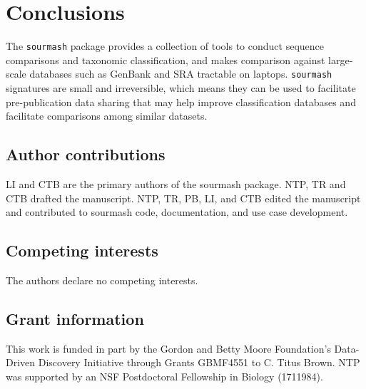 \documentclass[10pt,a4paper,twocolumn]{article}
\begin{document}
\section*{Conclusions}

The \lstinline{sourmash} package provides a collection of tools to conduct sequence comparisons and taxonomic classification, and makes comparison against large-scale databases such as GenBank and SRA tractable on laptops. \lstinline{sourmash} signatures are small and irreversible, which means they can be used to facilitate pre-publication data sharing that may help improve classification databases and facilitate comparisons among similar datasets. 


\subsection*{Author contributions}
LI and CTB are the primary authors of the sourmash package. NTP, TR and CTB drafted the manuscript. NTP, TR, PB, LI, and CTB edited the manuscript and contributed to sourmash code, documentation, and use case development. 

\subsection*{Competing interests}
The authors declare no competing interests.

\subsection*{Grant information}
This work is funded in part by the Gordon and Betty Moore Foundation’s Data-Driven Discovery Initiative through Grants GBMF4551 to C. Titus Brown. NTP was supported by an NSF Postdoctoral Fellowship in Biology (1711984).



{\small
}




\end{document}
